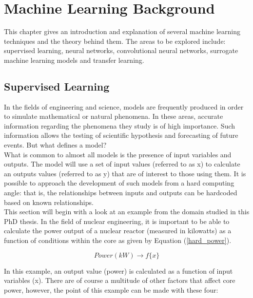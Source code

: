\chapter{Machine Learning Background}
\label{cha:ML}

This chapter gives an introduction and explanation of several machine learning techniques and the theory behind them. The areas to be explored include: supervised learning, neural networks, convolutional neural networks, surrogate machine learning models and transfer learning. 




\section{Supervised Learning} \label{supervised}

In the fields of engineering and science, models are frequently produced in order to simulate mathematical or natural phenomena. In these areas, accurate information regarding the phenomena they study is of high importance. Such information allows the testing of scientific hypothesis and forecasting of future events. But what defines a model? \\

\noindent 
What is common to almost all models is the presence of input variables and outputs. The model will use a set of input values (referred to as x) to calculate an outputs values (referred to as y) that are of interest to those using them. It is possible to approach the development of such models from a hard computing angle: that is, the relationships between inputs and outputs can be hardcoded based on known relationships. \\

\noindent
This section will begin with a look at an example from the domain studied in this PhD thesis. In the field of nuclear engineering, it is important to be able to calculate the power output of a nuclear reactor (measured in kilowatts) as a function of conditions within the core as given by Equation (\ref{hard_power}).

\begin{equation} \label{hard_power}
	Power(kW)  \rightarrow f\{x\}
\end{equation}

\noindent
In this example, an output value (power) is calculated as a function of input variables (x). There are of course a multitude of other factors that affect core power, however, the point of this example can be made with these four:


